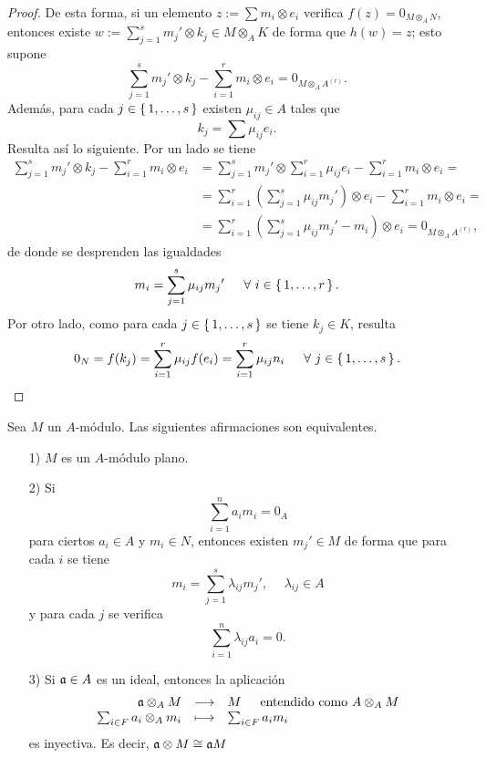 \documentclass[../main.tex]{subfiles}
\begin{document}
\begin{proof}
	De esta forma, si un elemento $z:=\sum m_i\otimes e_i$ verifica $f(z)=0_{M\otimes_A N}$, entonces existe $w:=\sum_{j=1}^s{m_j}'\otimes k_j\in M\otimes_A K$ de forma que $h(w)=z$; esto supone
	$$\sum_{j=1}^s {m_j}'\otimes k_j-\sum_{i=1}^r m_i\otimes e_i=0_{M\otimes_A A^{(r)}}.$$
	Además, para cada $j\in\set{1,\dots,s}$ existen $\mu_{ij}\in A$ tales que $$k_j=\sum \mu_{ij}e_i.$$
	Resulta así lo siguiente. Por un lado se tiene
	\begin{align*}
	\sum_{j=1}^s {m_j}'\otimes k_j-\sum_{i=1}^r m_i\otimes e_i&=\sum_{j=1}^s {m_j}'\otimes \sum_{i=1}^r \mu_{ij}e_i-\sum_{i=1}^r m_i\otimes e_i=\\
	&=\sum_{i=1}^r(\sum_{j=1}^s\mu_{ij}{m_j}')\otimes e_i-\sum_{i=1}^r m_i\otimes e_i=\\
	&=\sum_{i=1}^r(\sum_{j=1}^s\mu_{ij}{m_j}'-m_i)\otimes e_i=0_{M\otimes_A A^{(r)}},
	\end{align*}
	de donde se desprenden las igualdades
	\begin{equation}
	m_i=\sum_{j=1}^s\mu_{ij}{m_j}'\hspace{15pt}\forall\ i\in\set{1,\dots,r}.
	\end{equation}
	Por otro lado, como para cada $j\in\set{1,\dots,s}$ se tiene $k_j\in K$, resulta
	\begin{equation}
	0_N=f(k_j)=\sum_{i=1}^r\mu_{ij}f(e_i)=\sum_{i=1}^r\mu_{ij}n_i\hspace{15pt}\forall\ j\in\set{1,\dots,s}.
	\end{equation}
	
\end{proof}
\begin{theorem}
	Sea $M$ un $A$-módulo. Las siguientes afirmaciones son equivalentes.
	\begin{itemize}
		\item[1)]  $M$ es un $A$-módulo plano.
		\item[2)] Si $$\sum_{i=1}^na_im_i=0_A$$ para ciertos $a_i\in A$ y $m_i\in N$, entonces existen ${m_j}'\in M$ de forma que para cada $i$ se tiene $$m_i=\sum_{j=1}^s\lambda_{ij}{m_j}',\hspace{15pt}\lambda_{ij}\in A$$ y para cada $j$ se verifica $$\sum_{i=1}^n\lambda_{ij}a_i=0.$$
		\item [3)]  Si $\mathfrak{a}\in A$ es un ideal, entonces la aplicación
		$$\begin{array}{rcl}
		\af\otimes_A M&\longrightarrow&M\hspace{15pt}\text{entendido como}\ A\otimes_A M\\
		\sum_{i\in F}a_i\otimes_A m_i&\longmapsto&\sum_{i\in F}a_im_i
		\end{array}$$
		es inyectiva. Es decir, $\mathfrak{a}\otimes M\cong \mathfrak{a} M$
	\end{itemize}
\end{theorem}
\end{document}
